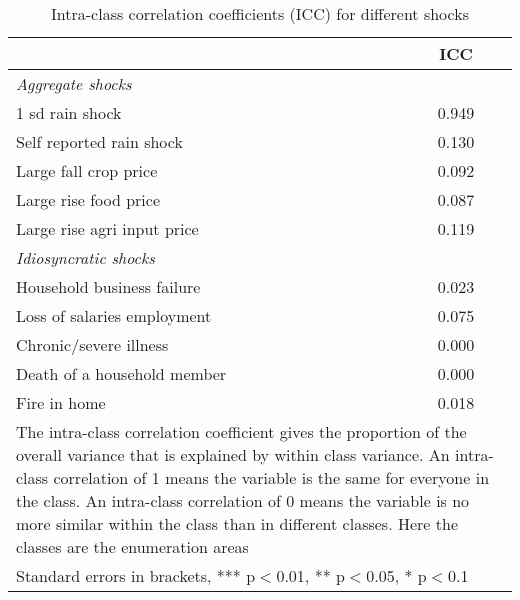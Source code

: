 \begin{table}[htbp]

  \centering
  \caption{Intra-class correlation coefficients (ICC) for different shocks} \label{ICC}
    \begin{tabular}{lc}
    \toprule
          & ICC  \\\hline
   \textit{Aggregate shocks} & \\
   1 sd rain shock & 0.949 \\
    Self reported rain shock & 0.130 \\
    Large fall crop price & 0.092 \\
    Large rise food price & 0.087 \\
    Large rise agri input price & 0.119 \\
    \textit{Idiosyncratic shocks} & \\
    Household business failure & 0.023 \\
    Loss of salaries employment & 0.075 \\
    Chronic/severe illness & 0.000 \\
    Death of a household member & 0.000 \\
    Fire in home &  0.018 \\
    \hline
\multicolumn{2}{p{10cm}}{The intra-class correlation coefficient gives the proportion of the overall variance that is explained by within class variance. An intra-class correlation of 1 means the variable is the same for everyone in the class. An intra-class correlation of 0 means the variable is no more similar within the class than in different classes. Here the classes are the enumeration areas } \\
\multicolumn{2}{l}{ Standard errors in brackets, *** p$<$0.01, ** p$<$0.05, * p$<$0.1} 
\end{tabular}
 \end{table}
    